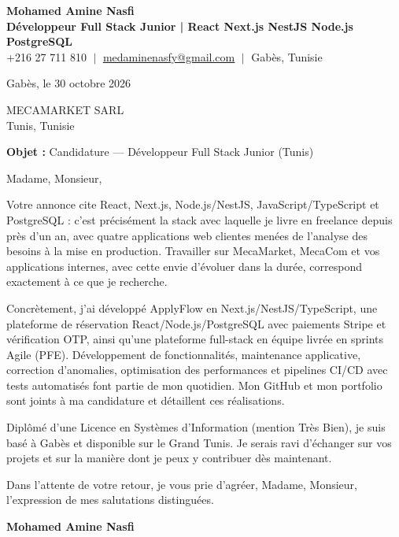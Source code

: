 \documentclass[11pt,a4paper]{article}
\begin{document}
\begin{center}
    \textbf{\Huge \color{navy} Mohamed Amine Nasfi} \\[3pt]
    \small \textbf{\color{accent} Développeur Full Stack Junior | React \textperiodcentered{} Next.js \textperiodcentered{} NestJS \textperiodcentered{} Node.js \textperiodcentered{} PostgreSQL} \\[3pt]
    \footnotesize \color{greytext}
    +216 27 711 810 $\;|\;$
    \href{mailto:medaminenasfy@gmail.com}{\underline{medaminenasfy@gmail.com}} $\;|\;$
    Gabès, Tunisie
\end{center}

\vspace{8pt}
\hfill Gabès, le 30 octobre 2026

\vspace{12pt}
MECAMARKET SARL \\ Tunis, Tunisie

\vspace{10pt}
\textbf{Objet :} Candidature — Développeur Full Stack Junior (Tunis)

\vspace{4pt}
Madame, Monsieur,

Votre annonce cite React, Next.js, Node.js/NestJS, JavaScript/TypeScript et PostgreSQL : c'est précisément la stack avec laquelle je livre en freelance depuis près d'un an, avec quatre applications web clientes menées de l'analyse des besoins à la mise en production. Travailler sur MecaMarket, MecaCom et vos applications internes, avec cette envie d'évoluer dans la durée, correspond exactement à ce que je recherche.

Concrètement, j'ai développé ApplyFlow en Next.js/NestJS/TypeScript, une plateforme de réservation React/Node.js/PostgreSQL avec paiements Stripe et vérification OTP, ainsi qu'une plateforme full-stack en équipe livrée en sprints Agile (PFE). Développement de fonctionnalités, maintenance applicative, correction d'anomalies, optimisation des performances et pipelines CI/CD avec tests automatisés font partie de mon quotidien. Mon GitHub et mon portfolio sont joints à ma candidature et détaillent ces réalisations.

Diplômé d'une Licence en Systèmes d'Information (mention Très Bien), je suis basé à Gabès et disponible sur le Grand Tunis. Je serais ravi d'échanger sur vos projets et sur la manière dont je peux y contribuer dès maintenant.

Dans l'attente de votre retour, je vous prie d'agréer, Madame, Monsieur, l'expression de mes salutations distinguées.

\vspace{14pt}
\hfill \textbf{Mohamed Amine Nasfi}
\end{document}
